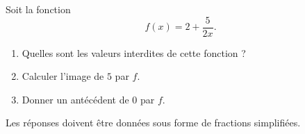 
\begin{exercice}\label{exosmath-0364}

    Soit la fonction
    \begin{equation}
        f(x)=2+\frac{ 5 }{ 2x }.
    \end{equation}
    \begin{enumerate}
        \item
            Quelles sont les valeurs interdites de cette fonction ?
        \item
            Calculer l'image de \( 5\) par \( f\).
        \item
            Donner un antécédent de \( 0\) par \( f\).
    \end{enumerate}
    Les réponses doivent être données sous forme de fractions simplifiées.

\end{exercice}
